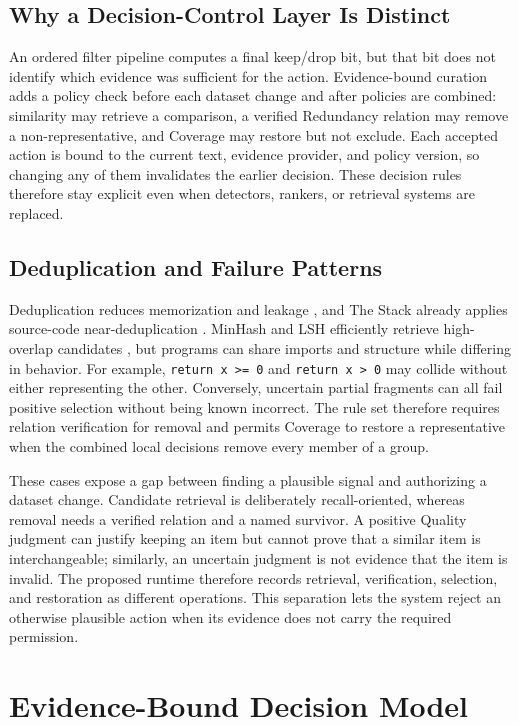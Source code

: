 \documentclass[conference]{IEEEtran}
\begin{document}
\subsection{Why a Decision-Control Layer Is Distinct}
An ordered filter pipeline computes a final keep/drop bit, but that bit does
not identify which evidence was sufficient for the action. Evidence-bound curation adds
a policy check before each dataset change and after policies are combined:
similarity may retrieve a comparison, a verified Redundancy relation may remove
a non-representative, and Coverage may restore but not exclude. Each accepted
action is bound to the current text, evidence provider, and policy version,
so changing any of them invalidates the earlier decision. These decision rules
therefore stay explicit even when detectors, rankers, or retrieval systems
are replaced.

\subsection{Deduplication and Failure Patterns}
Deduplication reduces memorization and leakage
\cite{lee2022deduplicating}, and The Stack already applies source-code
near-deduplication \cite{kocetkov2023stack}. MinHash and LSH efficiently retrieve
high-overlap candidates \cite{broder1997resemblance}, but programs can share
imports and structure while differing in behavior. For example,
\texttt{return x >= 0} and \texttt{return x > 0} may collide without either
representing the other. Conversely, uncertain partial fragments can all fail
positive selection without being known incorrect. The rule set therefore
requires relation verification for removal and permits Coverage to restore a
representative when the combined local decisions remove every member of a group.

These cases expose a gap between finding a plausible signal and authorizing a
dataset change. Candidate retrieval is deliberately recall-oriented, whereas
removal needs a verified relation and a named survivor. A positive Quality
judgment can justify keeping an item but cannot prove that a similar item is
interchangeable; similarly, an uncertain judgment is not evidence that the item
is invalid. The proposed runtime therefore records retrieval, verification,
selection, and restoration as different operations. This separation lets the
system reject an otherwise plausible action when its evidence does not carry the
required permission.

\section{Evidence-Bound Decision Model}
\end{document}
